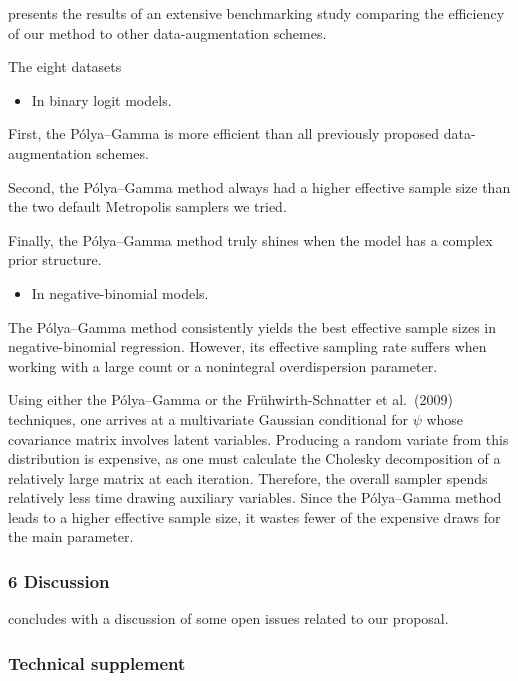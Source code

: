 \documentclass[
]{article}
\providecommand{\tightlist}{%
  \setlength{\itemsep}{0pt}\setlength{\parskip}{0pt}}
\begin{document}
presents the results of an extensive benchmarking study comparing the
efficiency of our method to other data-augmentation schemes.

The eight datasets

\begin{itemize}
\tightlist
\item
  In binary logit models.
\end{itemize}

First, the Pólya--Gamma is more efficient than all previously proposed
data-augmentation schemes.

Second, the Pólya--Gamma method always had a higher effective sample
size than the two default Metropolis samplers we tried.

Finally, the Pólya--Gamma method truly shines when the model has a
complex prior structure.

\begin{itemize}
\tightlist
\item
  In negative-binomial models.
\end{itemize}

The Pólya--Gamma method consistently yields the best effective sample
sizes in negative-binomial regression. However, its effective sampling
rate suffers when working with a large count or a nonintegral
overdispersion parameter.

Using either the Pólya--Gamma or the Frühwirth-Schnatter et al.~(2009)
techniques, one arrives at a multivariate Gaussian conditional for
\(\psi\) whose covariance matrix involves latent variables. Producing a
random variate from this distribution is expensive, as one must
calculate the Cholesky decomposition of a relatively large matrix at
each iteration. Therefore, the overall sampler spends relatively less
time drawing auxiliary variables. Since the Pólya--Gamma method leads to
a higher effective sample size, it wastes fewer of the expensive draws
for the main parameter.

\hypertarget{discussion}{%
\subsubsection{6 Discussion}\label{discussion}}

concludes with a discussion of some open issues related to our proposal.

\hypertarget{technical-supplement}{%
\subsubsection{Technical supplement}\label{technical-supplement}}
\end{document}

